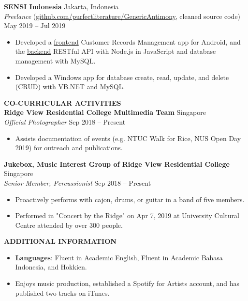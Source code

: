\documentclass[a4paper, 11pt]{article}
\newcommand{\interspace}{\vspace{7pt}}
\newcommand{\intraspace}{\vspace{2pt}}
\begin{document}
	\intraspace
	
	\textbf{SENSI Indonesia} \hfill Jakarta, Indonesia\\
	\textit{Freelance} (\href{https://github.com/purfectliterature/GenericAntimony}{github.com/purfectliterature/GenericAntimony}, cleaned source code) \hfill May 2019 -- Jul 2019
	\begin{itemize}[leftmargin=*, noitemsep, topsep=0pt]
		\item Developed a \href{https://github.com/purfectliterature/GenericAntimony}{frontend} Customer Records Management app for Android, and the \href{https://github.com/purfectliterature/GenericAntimonyBackend}{backend} RESTful API with Node.js in JavaScript and database management with MySQL.
		\item Developed a Windows app for database create, read, update, and delete (CRUD) with VB.NET and MySQL.
	\end{itemize}
	
	\interspace
	
	\textbf{\large CO-CURRICULAR ACTIVITIES} \hrulefill \\
	\textbf{Ridge View Residential College Multimedia Team} \hfill Singapore\\
	\textit{Official Photographer} \hfill Sep 2018 -- Present
	\begin{itemize}[leftmargin=*, noitemsep, topsep=0pt]
		\item Assists documentation of events (e.g. NTUC Walk for Rice, NUS Open Day 2019) for outreach and publications.
	\end{itemize}
	\intraspace
	
	\textbf{Jukebox, Music Interest Group of Ridge View Residential College} \hfill Singapore\\
	\textit{Senior Member, Percussionist} \hfill Sep 2018 -- Present
	\begin{itemize}[leftmargin=*, noitemsep, topsep=0pt]
		\item Proactively performs with cajon, drums, or guitar in a band of five members.
		\item Performed in "Concert by the Ridge" on Apr 7, 2019 at University Cultural Centre attended by over 300 people.
	\end{itemize}

	\interspace
	
	\textbf{\large ADDITIONAL INFORMATION} \hrulefill
	\begin{itemize}[leftmargin=*, noitemsep, topsep=0pt]
		\item \textbf{Languages}: Fluent in Academic English, Fluent in Academic Bahasa Indonesia, and Hokkien.
		\item Enjoys music production, established a Spotify for Artists account, and has published two tracks on iTunes.
	\end{itemize}
\end{document}
